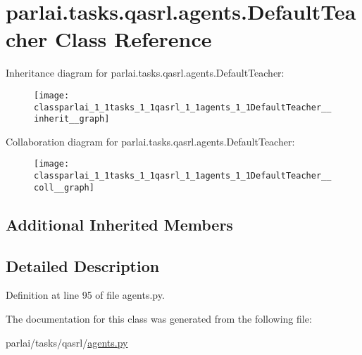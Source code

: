 \hypertarget{classparlai_1_1tasks_1_1qasrl_1_1agents_1_1DefaultTeacher}{}\section{parlai.\+tasks.\+qasrl.\+agents.\+Default\+Teacher Class Reference}
\label{classparlai_1_1tasks_1_1qasrl_1_1agents_1_1DefaultTeacher}


Inheritance diagram for parlai.\+tasks.\+qasrl.\+agents.\+Default\+Teacher\+:
\nopagebreak
\begin{figure}[H]
\begin{center}
\leavevmode
\texttt{[image: classparlai\_1\_1tasks\_1\_1qasrl\_1\_1agents\_1\_1DefaultTeacher\_\_inherit\_\_graph]}
\end{center}
\end{figure}


Collaboration diagram for parlai.\+tasks.\+qasrl.\+agents.\+Default\+Teacher\+:
\nopagebreak
\begin{figure}[H]
\begin{center}
\leavevmode
\texttt{[image: classparlai\_1\_1tasks\_1\_1qasrl\_1\_1agents\_1\_1DefaultTeacher\_\_coll\_\_graph]}
\end{center}
\end{figure}
\subsection*{Additional Inherited Members}


\subsection{Detailed Description}


Definition at line 95 of file agents.\+py.



The documentation for this class was generated from the following file\+:\begin{DoxyCompactItemize}
\item 
parlai/tasks/qasrl/\hyperlink{parlai_2tasks_2qasrl_2agents_8py}{agents.\+py}\end{DoxyCompactItemize}

